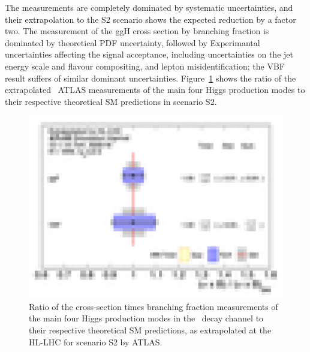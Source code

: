 The measurements are completely dominated by systematic uncertainties, and their extrapolation to the S2 scenario shows the expected reduction by a factor two. The measurement of the ggH cross section by branching fraction is dominated by theoretical PDF uncertainty, followed by Experimantal uncertainties affecting the signal acceptance, including uncertainties on the jet energy scale and flavour compositing, and lepton misidentification; the VBF result suffers of similar dominant uncertainties.
Figure~\ref{fig:HWW_ATLAS_HLLHC_S2} shows the ratio of the extrapolated \HWW\ ATLAS measurements of the main four Higgs production modes to their respective theoretical SM predictions in scenario S2.

\begin{figure}
  \centering
  \includegraphics[width=0.6\linewidth]{section2/plots/channels/ATLAS_HWW_compareToSM_prodXS}
  \caption{Ratio of the cross-section times branching fraction measurements of the main four Higgs production modes in the \HWW\ decay channel to their respective theoretical SM predictions, as extrapolated at the HL-LHC for scenario S2 by ATLAS.}
  \label{fig:HWW_ATLAS_HLLHC_S2}
\end{figure}
